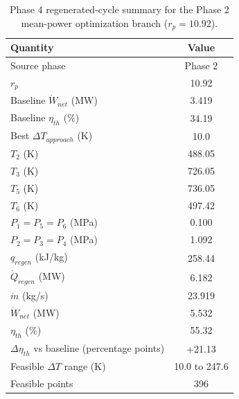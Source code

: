 \begin{table}[htbp]
    \centering
    \caption{Phase 4 regenerated-cycle summary for the Phase 2 mean-power optimization branch ($r_p = 10.92$).}
    \label{tab:phase4_summary_phase2_optimization}
    \begin{tabular}{lc}
        \hline
        Quantity & Value \\
        \hline
        Source phase & Phase 2 \\
        $r_p$ & 10.92 \\
        Baseline $\dot{W}_{net}$ (MW) & 3.419 \\
        Baseline $\eta_{th}$ (\%) & 34.19 \\
        Best $\Delta T_{approach}$ (K) & 10.0 \\
        $T_2$ (K) & 488.05 \\
        $T_3$ (K) & 726.05 \\
        $T_5$ (K) & 736.05 \\
        $T_6$ (K) & 497.42 \\
        $P_1=P_5=P_6$ (MPa) & 0.100 \\
        $P_2=P_3=P_4$ (MPa) & 1.092 \\
        $q_{regen}$ (kJ/kg) & 258.44 \\
        $\dot{Q}_{regen}$ (MW) & 6.182 \\
        $\dot{m}$ (kg/s) & 23.919 \\
        $\dot{W}_{net}$ (MW) & 5.532 \\
        $\eta_{th}$ (\%) & 55.32 \\
        $\Delta\eta_{th}$ vs baseline (percentage points) & +21.13 \\
        Feasible $\Delta T$ range (K) & 10.0 to 247.6 \\
        Feasible points & 396 \\
        \hline
    \end{tabular}
\end{table}
